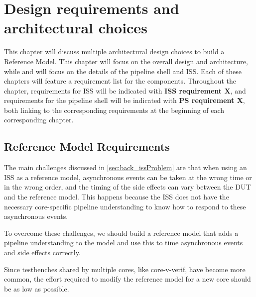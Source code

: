 \chapter{Design requirements and architectural choices}
\label{ch:design}

This chapter will discuss multiple architectural design choices to build a Reference Model. This chapter will focus on the overall design and architecture, while  and  will focus on the details of the pipeline shell and ISS. Each of these chapters will feature a requirement list for the components. Throughout the chapter, requirements for ISS will be indicated with \textbf{ISS requirement X}, and requirements for the pipeline shell will be indicated with \textbf{PS requirement X}, both linking to the corresponding requirements at the beginning of each corresponding chapter.

\section{Reference Model Requirements}
The main challenges discussed in \cref{sec:back_issProblem} are that when using an ISS as a reference model, asynchronous events can be taken at the wrong time or in the wrong order, and the timing of the side effects can vary between the DUT and the reference model. This happens because the ISS does not have the necessary core-specific pipeline understanding to know how to respond to these asynchronous events.

To overcome these challenges, we should build a reference model that adds a pipeline understanding to the model and use this to time asynchronous events and side effects correctly.

Since testbenches shared by multiple cores, like core-v-verif, have become more common, the effort required to modify the reference model for a new core should be as low as possible.




